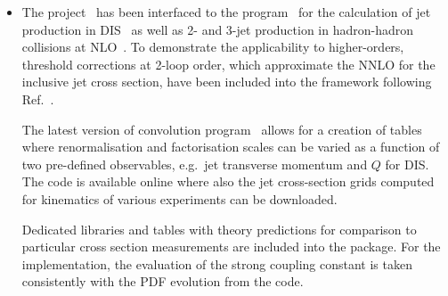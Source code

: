 \begin{itemize}
  \item The \fastnlo project~\cite{Kluge:2006xs} has been interfaced
    to the \nlojetpp program~\cite{Nagy:1998bb} for the calculation of
    jet production in DIS~\cite{Nagy:2001xb} as well as 2- and 3-jet
    production in hadron-hadron collisions at
    NLO~\cite{Nagy:2003tz,Nagy:2001fj}. To demonstrate the
    applicability to higher-orders, threshold corrections at 2-loop
    order, which approximate the NNLO for the inclusive jet cross
    section, have been included into the framework \cite{Wobisch:2011ij} 
    following Ref.~\cite{Kidonakis:2000gi}.

    The latest version of \fastnlo convolution program~\cite{Britzger:2012bs} allows for a
    creation of tables where renormalisation and factorisation scales
    can be varied as a function of two pre-defined observables, e.g.\ jet
    transverse momentum \pperp and $Q$ for DIS\@. 
    The \fastnlo code is available online \cite{fastNLO:HepForge} where also the
    jet cross-section grids computed for kinematics of various experiments
    can be downloaded.

    Dedicated \fastnlo libraries and tables with theory predictions  for comparison to
    particular cross section measurements are included into the \fitter package. 
    For the \fitter implementation, the evaluation of the strong coupling constant is taken
    consistently with the PDF evolution from the \qcdnum code. 
%
%


\end{itemize}
